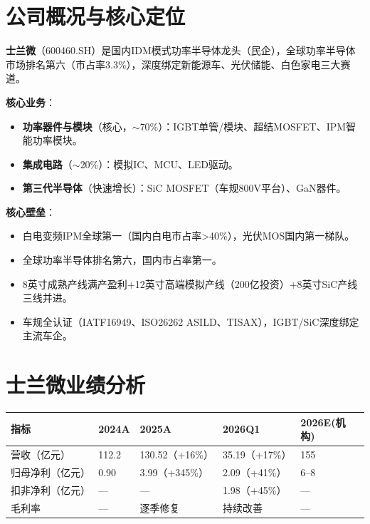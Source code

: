 \documentclass[a4paper,11pt,fontset=none]{ctexart}
\begin{document}
\section{公司概况与核心定位}

\textbf{士兰微}（600460.SH）是国内IDM模式功率半导体龙头（民企），全球功率半导体市场排名第六（市占率3.3\%），深度绑定新能源车、光伏储能、白色家电三大赛道。

\textbf{核心业务}：
\begin{itemize}
  \item \textbf{功率器件与模块}（核心，$\sim$70\%）：IGBT单管/模块、超结MOSFET、IPM智能功率模块。
  \item \textbf{集成电路}（$\sim$20\%）：模拟IC、MCU、LED驱动。
  \item \textbf{第三代半导体}（快速增长）：SiC MOSFET（车规800V平台）、GaN器件。
\end{itemize}

\textbf{核心壁垒}：
\begin{itemize}
  \item 白电变频IPM全球第一（国内白电市占率>40\%），光伏MOS国内第一梯队。
  \item 全球功率半导体排名第六，国内市占率第一。
  \item 8英寸成熟产线满产盈利+12英寸高端模拟产线（200亿投资）+8英寸SiC产线三线并进。
  \item 车规全认证（IATF16949、ISO26262 ASILD、TISAX），IGBT/SiC深度绑定主流车企。
\end{itemize}

\section{士兰微业绩分析}

\begin{exhibitbox}
\begin{tabularx}{\textwidth}{L{3.2cm}XXXX}
\toprule
\textbf{指标} & \textbf{2024A} & \textbf{2025A} & \textbf{2026Q1} & \textbf{2026E(机构)} \\
\midrule
营收（亿元） & 112.2 & 130.52（+16\%） & 35.19（+17\%） & 155 \\
归母净利（亿元） & 0.90 & 3.99（+345\%） & 2.09（+41\%） & 6--8 \\
扣非净利（亿元） & --- & --- & 1.98（+45\%） & --- \\
毛利率 & --- & 逐季修复 & 持续改善 & --- \\
\bottomrule
\end{tabularx}
\end{exhibitbox}
\end{document}
